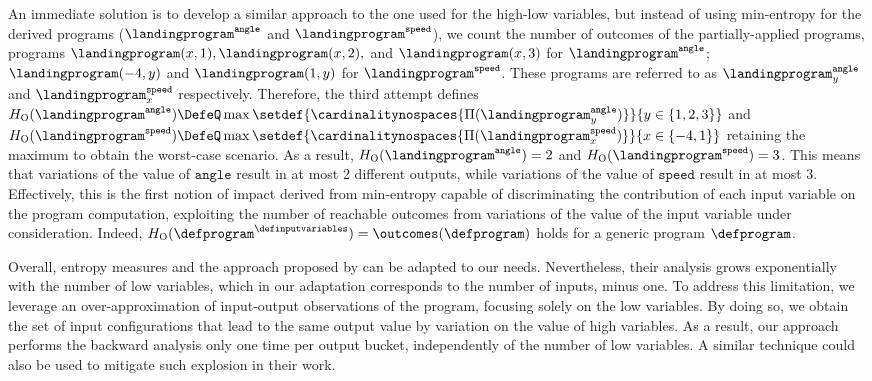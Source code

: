 \newcommand{\outcomesentropy}{{H_\textsc{O}}}
An immediate solution is to develop a similar approach to the one used for the high-low variables, but instead of using min-entropy for the derived programs ($\landingprogram^{\texttt{angle}}$ and $\landingprogram^{\texttt{speed}}$), we count the number of outcomes of the partially-applied programs, \cf{} programs
$\landingprogram(x, 1), \landingprogram(x, 2),$ and $\landingprogram(x, 3)$ for $\landingprogram^{\texttt{angle}}$; $\landingprogram(-4, y)$ and $\landingprogram(1, y)$ for $\landingprogram^{\texttt{speed}}$.
These programs are referred to as $\landingprogram^{\texttt{angle}}_y$ and $\landingprogram^{\texttt{speed}}_x$ respectively.
Therefore, the third attempt defines $\outcomesentropy(\landingprogram^{\texttt{angle}})\DefeQ \max \setdef{ \cardinalitynospaces{\entropypartitions[\landingprogram^{\texttt{angle}}_y]}}{y\in\{1, 2, 3\}}$ and $\outcomesentropy(\landingprogram^{\texttt{speed}})\DefeQ \max \setdef{\cardinalitynospaces{\entropypartitions[\landingprogram^{\texttt{speed}}_x]}}{x\in\{-4, 1\}}$ retaining the maximum to obtain the worst-case scenario.
As a result, $\outcomesentropy(\landingprogram^{\texttt{angle}})=2$ and $\outcomesentropy(\landingprogram^{\texttt{speed}})=3$. This means that variations of the value of ${\texttt{angle}}$ result in at most 2 different outputs, while variations of the value of ${\texttt{speed}}$ result in at most 3.
Effectively, this is the first notion of impact derived from min-entropy capable of discriminating the contribution of each input variable on the program computation, exploiting the number of reachable outcomes from variations of the value of the input variable under consideration.
Indeed, $\outcomesentropy(\defprogram^\definputvariables)=\outcomes(\defprogram)$ holds for a generic program $\defprogram$.

Overall, entropy measures and the approach proposed by  can be adapted to our needs. Nevertheless, their analysis grows exponentially with the number of low variables, which in our adaptation corresponds to the number of inputs, minus one. To address this limitation, we leverage an over-approximation of input-output observations of the program, focusing solely on the low variables. By doing so, we obtain the set of input configurations that lead to the same output value by variation on the value of high variables.
As a result, our approach performs the backward analysis only one time per output bucket, independently of the number of low variables.
A similar technique could also be used to mitigate such explosion in their work.

